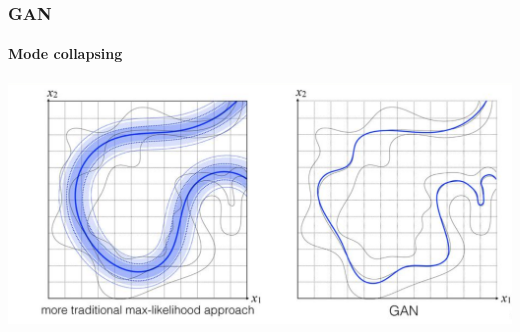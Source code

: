 \documentclass[10pt]{beamer}
\begin{document}
\begin{frame}
\frametitle{GAN}
\framesubtitle{Mode collapsing}

\includegraphics[width=\textwidth]{images/ml_vs_gan.png}

\end{frame}
\end{document}
